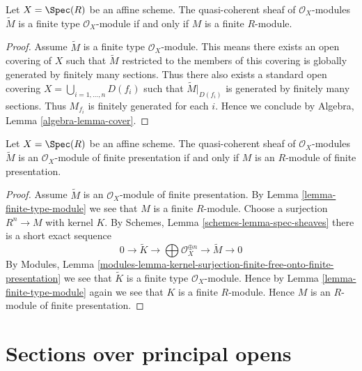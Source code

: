 \begin{lemma}
\label{lemma-finite-type-module}
Let $X = \Spec(R)$ be an affine scheme.
The quasi-coherent sheaf of $\mathcal{O}_X$-modules
$\widetilde M$ is a finite type $\mathcal{O}_X$-module
if and only if $M$ is a finite $R$-module.
\end{lemma}

\begin{proof}
Assume $\widetilde M$ is a finite type $\mathcal{O}_X$-module.
This means there exists an open covering of $X$ such that
$\widetilde M$ restricted to the members of this covering is
globally generated by finitely many sections.
Thus there also exists a standard open covering
$X = \bigcup_{i = 1, \ldots, n} D(f_i)$ such that $\widetilde M|_{D(f_i)}$
is generated by finitely many sections. Thus $M_{f_i}$ is finitely
generated for each $i$. Hence we conclude by
Algebra, Lemma \ref{algebra-lemma-cover}.
\end{proof}

\begin{lemma}
\label{lemma-finite-presentation-module}
Let $X = \Spec(R)$ be an affine scheme. The quasi-coherent sheaf
of $\mathcal{O}_X$-modules $\widetilde M$ is an $\mathcal{O}_X$-module of
finite presentation if and only if $M$ is an $R$-module of finite presentation.
\end{lemma}

\begin{proof}
Assume $\widetilde M$ is an $\mathcal{O}_X$-module of finite presentation.
By Lemma \ref{lemma-finite-type-module} we see that $M$ is a finite $R$-module.
Choose a surjection $R^n \to M$ with kernel $K$. By
Schemes, Lemma \ref{schemes-lemma-spec-sheaves}
there is a short exact sequence
$$
0 \to \widetilde{K} \to
\bigoplus \mathcal{O}_X^{\oplus n} \to
\widetilde{M} \to 0
$$
By
Modules, Lemma
\ref{modules-lemma-kernel-surjection-finite-free-onto-finite-presentation}
we see that $\widetilde{K}$ is a finite type $\mathcal{O}_X$-module.
Hence by Lemma \ref{lemma-finite-type-module}
again we see that $K$ is a finite $R$-module.
Hence $M$ is an $R$-module of finite presentation.
\end{proof}







\section{Sections over principal opens}
\label{section-principal-opens}


